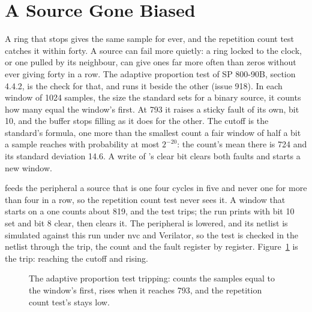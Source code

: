 \section{A Source Gone Biased}
\label{sec:x-trngapt}

A ring that stops gives the same sample for ever, and the repetition
count test catches it within forty. A source can fail more quietly: a
ring locked to the clock, or one pulled by its neighbour, can give
ones far more often than zeros without ever giving forty in a row.
The adaptive proportion test of SP 800-90B, section 4.4.2, is the
check for that, and  runs it beside the other (issue 918).
In each window of 1024 samples, the size the standard sets for a
binary source, it counts how many equal the window's first. At 793 it
raises a sticky fault of its own,  bit 10, and the buffer
stops filling as it does for the other. The cutoff is the standard's
formula, one more than the smallest count a fair window of half a bit
a sample reaches with probability at most $2^{-20}$: the count's mean
there is 724 and its standard deviation 14.6. A write of
's clear bit clears both faults and starts a new window.

 feeds the peripheral a source that is one four
cycles in five and never one for more than four in a row, so the
repetition count test never sees it. A window that starts on a one
counts about 819, and the test trips; the run prints 
with bit 10 set and bit 8 clear, then clears it. The peripheral is
lowered, and its netlist is simulated against this run under nvc and
Verilator, so the test is checked in the netlist through the trip,
the count and the fault register by register.
Figure~\ref{fig:x-trngapt} is the trip:  reaching the
cutoff and  rising.

\begin{figure}[htbp]
\centering

\caption{The adaptive proportion test tripping:  counts the
samples equal to the window's first,  rises when it
reaches 793, and the repetition count test's  stays low.}
\label{fig:x-trngapt}
\end{figure}




